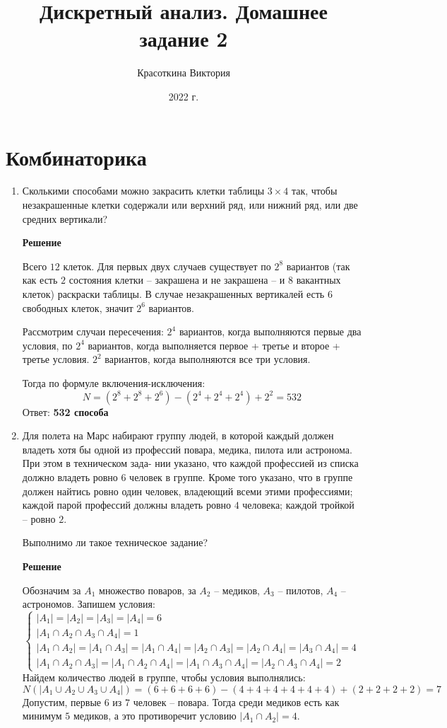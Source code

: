 \documentclass[12pt]{article}
\author{Красоткина Виктория}
\title{Дискретный анализ. Домашнее задание 2}
\date{2022 г.}
\newcommand{\RomanNumeralCaps}[1]
{\MakeUppercase{\romannumeral #1}}
\begin{document}
	
	\maketitle
	\tableofcontents
	\thispagestyle{empty}
	\newpage
	
	\section{Комбинаторика \RomanNumeralCaps{3}}
	\begin{enumerate}[label={\textbf{\arabic{section}.\arabic*}}]
		\item Сколькими способами можно закрасить клетки таблицы $3\times 4$ так, чтобы незакрашенные клетки содержали или верхний ряд, или нижний ряд, или две средних вертикали?
		
		\textbf{Решение}
		
		Всего $12$ клеток. Для первых двух случаев существует по $2^8$ вариантов (так как есть $2$ состояния клетки -- закрашена и не закрашена -- и $8$ вакантных клеток) раскраски таблицы. В случае незакрашенных вертикалей есть $6$ свободных клеток, значит $2^6$ вариантов.
		
		Рассмотрим случаи пересечения: $2^4$ вариантов, когда выполняются первые два условия, по $2^4$ вариантов, когда выполняется первое + третье и второе + третье условия. $2^2$ вариантов, когда выполняются все три условия.
		
		Тогда по формуле включения-исключения:
		$$
		N = (2^8 + 2^8 + 2^6) - (2^4 + 2^4 + 2^4) + 2^2 = 532
		$$
		Ответ: \textbf{532 способа}
		
		\item Для полета на Марс набирают группу людей, в которой каждый должен владеть хотя бы одной из профессий повара, медика, пилота или астронома. При этом в техническом зада-
		нии указано, что каждой профессией из списка должно владеть ровно $6$ человек в группе. Кроме того указано, что в группе должен найтись ровно один человек, владеющий всеми этими профессиями; каждой парой профессий должны владеть ровно $4$ человека; каждой тройкой -- ровно $2$. 
		
		Выполнимо ли такое техническое задание?
		
		\textbf{Решение}
		
		Обозначим за $A_1$ множество поваров, за $A_2$ -- медиков, $A_3$ -- пилотов, $A_4$ -- астрономов. Запишем условия:
		$$
		\begin{cases}
			|A_1| = |A_2| = |A_3| = |A_4| = 6 \\
			|A_1\cap A_2\cap A_3\cap A_4| = 1 \\
			|A_1\cap A_2| = |A_1\cap A_3| = |A_1\cap A_4| = |A_2\cap A_3| = |A_2\cap A_4| = |A_3\cap A_4| = 4 \\
			|A_1\cap A_2\cap A_3| = |A_1\cap A_2\cap A_4| = |A_1\cap A_3\cap A_4| = |A_2\cap A_3\cap A_4| = 2
		\end{cases}
		$$
		Найдем количество людей в группе, чтобы условия выполнялись:
		$$
		N(|A_1\cup A_2\cup A_3\cup A_4|) = (6 + 6 + 6 + 6) - (4 + 4 + 4 + 4 + 4 + 4) + (2 + 2 + 2 + 2) = 7
		$$ 
		Допустим, первые $6$ из $7$ человек -- повара. Тогда среди медиков есть как минимум $5$ медиков, а это противоречит условию $|A_1\cap A_2| = 4$.
		

\end{enumerate}
\end{document}
